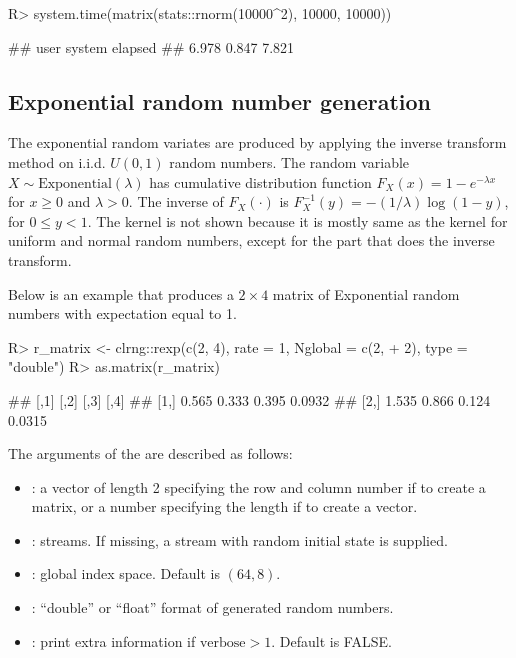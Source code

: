 \documentclass[article,nojss]{jss}\usepackage[]{graphicx}\usepackage[]{color}
\newcommand{\fct}[1]{\code{#1()}}
\begin{document}
\begin{CodeChunk}
\begin{CodeInput}
R> system.time(matrix(stats::rnorm(10000^2), 10000, 10000))
\end{CodeInput}
\begin{CodeOutput}
##    user  system elapsed 
##   6.978   0.847   7.821
\end{CodeOutput} 
\end{CodeChunk} 



\subsection{Exponential random number generation}
The exponential random variates are produced by applying the inverse transform method on i.i.d. $U(0,1)$ random numbers. The random variable $X \sim \text{Exponential}(\lambda)$ has cumulative distribution function $F_{X}(x)=1-e^{-\lambda x}$ for $x \geq 0$ and $\lambda > 0$. The inverse of $F_{X}(\cdot)$ is $F^{-1}_{X}(y)= -(1/ \lambda) \log (1-y)$, for $ 0 \leq y <1$. The kernel is not shown because it is mostly same as the kernel for uniform and normal random numbers, except for the part that does the inverse transform. %

Below is an example that produces a $2 \times 4$ matrix of Exponential random numbers with expectation equal to 1.
\begin{CodeChunk}
\begin{CodeInput}
R> r_matrix <- clrng::rexp(c(2, 4), rate = 1, Nglobal = c(2,
+    2), type = "double")
R> as.matrix(r_matrix)
\end{CodeInput}
\begin{CodeOutput}
##       [,1]  [,2]  [,3]   [,4]
## [1,] 0.565 0.333 0.395 0.0932
## [2,] 1.535 0.866 0.124 0.0315
\end{CodeOutput} 
\end{CodeChunk} 

The arguments of the \fct{clrng::rexp} are described as follows:
\begin{itemize}
\itemsep0em 
  \item {}: a vector of length 2 specifying the row and column number if to create a matrix, or a number specifying the length if to create a vector.
  \item {}: streams. If missing, a stream with random initial state is supplied.
  \item {}: global index space. Default is $(64,8)$.
  \item {}: ``double'' or ``float'' format of generated random numbers.
  \item {}: print extra information if $\text{verbose} > 1$. Default is FALSE.
\end{itemize}
\end{document}

